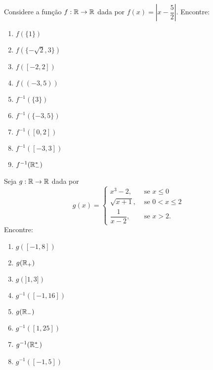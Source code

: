 \documentclass[12pt]{exam}
\begin{document}
\questao{} Considere a função $f : \mathbb{R} \to \mathbb{R}$ dada por $f(x) = \left| x - \dfrac{5}{2}\right|$. Encontre:
\begin{multicols}{3}
    \begin{enumerate}[label={\alph*})]
        \item $f(\{1\})$

        \item $f(\{-\sqrt{2}, 3\})$

        \item $f([-2,2])$

        \item $f((-3,5))$

        \item $f^{-1}(\{3\})$

        \item $f^{-1}(\{-3,5\})$

        \item $f^{-1}([0,2])$

        \item $f^{-1}([-3,3])$

        \item $f^{-1}(\mathbb{R}^*_-)$
    \end{enumerate}
\end{multicols}

\vspace{.3cm}

\questao{} Seja $g : \mathbb{R} \to \mathbb{R}$ dada por
\[
g(x) = \begin{cases}
    x^3 - 2,& \mbox{ se } x \le 0\\
    \sqrt{x + 1}, & \mbox{ se } 0 < x \le 2\\
    \dfrac{1}{x - 2}, & \mbox{ se } x > 2.
\end{cases}
\]
Encontre:
\begin{multicols}{2}
    \begin{enumerate}[label={\alph*})]
        \item $g([-1,8])$

        \item $g(\mathbb{R}_+)$

        \item $g(]1, 3])$

        \item $g^{-1}([-1,16])$

        \item $g(\mathbb{R}_-)$

        \item $g^{-1}([1,25])$

        \item $g^{-1}(\mathbb{R}^*_-)$

        \item $g^{-1}([-1,5])$
    \end{enumerate}
\end{multicols}
\end{document}
